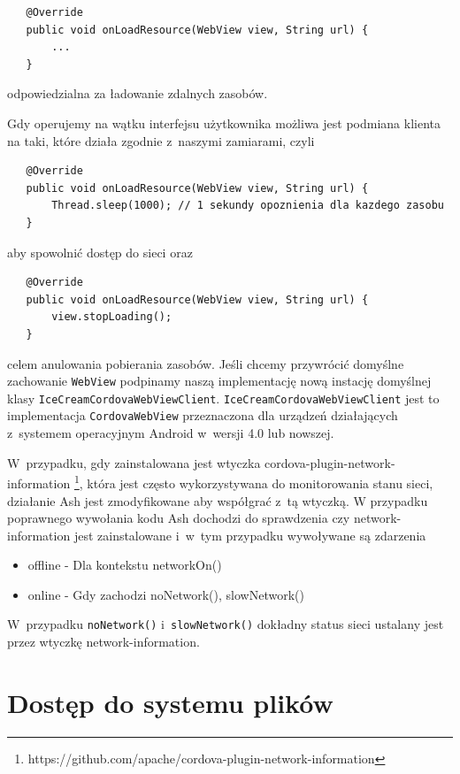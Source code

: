 \documentclass[brudnopis]{xmgr}
\begin{document}
\begin{lstlisting}
   @Override
   public void onLoadResource(WebView view, String url) {
       ...
   }
\end{lstlisting}

odpowiedzialna za ładowanie zdalnych zasobów.

Gdy operujemy na wątku interfejsu użytkownika możliwa jest podmiana klienta na taki, które działa zgodnie z~naszymi zamiarami, czyli 

\begin{lstlisting}
   @Override
   public void onLoadResource(WebView view, String url) {
       Thread.sleep(1000); // 1 sekundy opoznienia dla kazdego zasobu
   }
\end{lstlisting}

aby spowolnić dostęp do sieci oraz

\begin{lstlisting}
   @Override
   public void onLoadResource(WebView view, String url) {
       view.stopLoading();
   }
\end{lstlisting}

celem anulowania pobierania zasobów. Jeśli chcemy przywrócić domyślne zachowanie \texttt{WebView} podpinamy naszą implementację nową instację domyślnej klasy \texttt{IceCreamCordovaWebViewClient}. \texttt{IceCreamCordovaWebViewClient} jest to implementacja \texttt{CordovaWebView} przeznaczona dla urządzeń działających z~systemem operacyjnym Android w~wersji 4.0 lub nowszej.

W~przypadku, gdy zainstalowana jest wtyczka cordova-plugin-network-information \footnote{https://github.com/apache/cordova-plugin-network-information}, która jest często wykorzystywana do monitorowania stanu sieci, działanie Ash jest zmodyfikowane aby współgrać z~tą wtyczką. W przypadku poprawnego wywołania kodu Ash dochodzi do sprawdzenia czy network-information jest zainstalowane i~w~tym przypadku wywoływane są zdarzenia

\begin{itemize}
  \item offline - Dla kontekstu networkOn() 
  \item online - Gdy zachodzi noNetwork(), slowNetwork()
\end{itemize}

W~przypadku \texttt{noNetwork()} i~\texttt{slowNetwork()} dokładny status sieci ustalany jest przez wtyczkę network-information.

\section{Dostęp do systemu plików}
\end{document}

